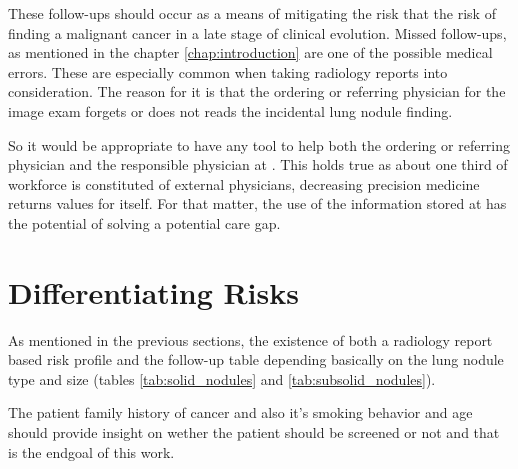 These follow-ups should occur as a  means of mitigating the risk that the risk of finding a malignant cancer in a late stage of clinical evolution. Missed follow-ups, as mentioned in  the chapter \ref{chap:introduction} are one of the possible medical errors. These are especially common when taking radiology reports into consideration. The reason for it is that the ordering or referring physician for the image exam forgets or does not reads the incidental lung nodule finding. 

So it would be appropriate to have any tool to help both the ordering or referring physician and the responsible physician at \nomeHsl{}. This holds true as about one third of \nomeHslShort{} workforce is constituted of external physicians, decreasing precision medicine returns values for itself. For that matter, the use of the information stored at \nomeHslShort{} has the potential of solving a potential care gap. 

\section{Differentiating Risks}

As mentioned in the previous sections, the existence of both a radiology report based risk profile and the follow-up table depending basically on the lung nodule type and  size (tables \ref{tab:solid_nodules} and \ref{tab:subsolid_nodules}). 

The patient family history of cancer and also it's smoking behavior and age should provide insight on wether the patient should be screened or not and that is the endgoal of this work.

